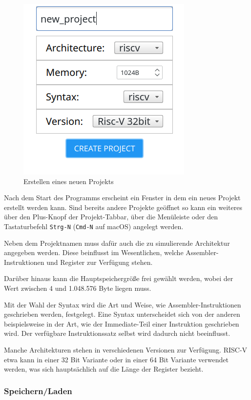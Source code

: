 \begin{figure}[ht]
	\centering
  \includegraphics[scale=1]{Images/create_new_project}
	\caption{Erstellen eines neuen Projekts}
	\label{Project_Creation}
\end{figure}

Nach dem Start des Programms erscheint ein Fenster in dem ein neues Projekt
erstellt werden kann. Sind bereits andere Projekte geöffnet so kann ein weiteres
über den Plus-Knopf der Projekt-Tabbar, über die Menüleiste oder den
Tastaturbefehl \texttt{Strg-N} (\texttt{Cmd-N} auf macOS) angelegt werden.

Neben dem Projektnamen muss dafür auch die zu simulierende Architektur angegeben
werden. Diese beinflusst im Wesentlichen, welche
Assembler-Instruktionen und Register zur Verfügung stehen.

Darüber hinaus kann die Hauptspeichergröße frei gewählt werden, wobei der Wert
zwischen 4 und 1.048.576 Byte liegen muss.

Mit der Wahl der Syntax wird die Art und Weise, wie Assembler-Instruktionen
geschrieben werden, festgelegt. Eine Syntax unterscheidet sich von der anderen
beispielsweise in der Art, wie der Immediate-Teil einer Instruktion geschrieben
wird. Der verfügbare Instruktionssatz selbst wird dadurch nicht beeinflusst.

Manche Architekturen stehen in verschiedenen Versionen zur Verfügung. RISC-V
etwa kann in einer 32 Bit Variante oder in einer 64 Bit Variante verwendet
werden, was sich hauptsächlich auf die Länge der Register bezieht.


\subsubsection{Speichern/Laden}

